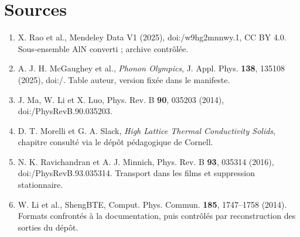 \documentclass[11pt,a4paper]{article}
\begin{document}
\section{Sources}
\begin{enumerate}
\item X. Rao et al., Mendeley Data V1 (2025), doi:/\allowbreak w9hg2mnnwy.1, CC BY 4.0. Sous-ensemble AlN converti ; archive contrôlée.
\item A. J. H. McGaughey et al., \emph{Phonon Olympics}, J. Appl. Phys. \textbf{138}, 135108 (2025), doi:/. Table auteur, version fixée dans le manifeste.
\item J. Ma, W. Li et X. Luo, Phys. Rev. B \textbf{90}, 035203 (2014), doi:/\allowbreak PhysRevB.90.035203.
\item D. T. Morelli et G. A. Slack, \emph{High Lattice Thermal Conductivity Solids}, chapitre consulté via le dépôt pédagogique de Cornell.
\item N. K. Ravichandran et A. J. Minnich, Phys. Rev. B \textbf{93}, 035314 (2016), doi:/\allowbreak PhysRevB.93.035314. Transport dans les films et suppression stationnaire.
\item W. Li et al., ShengBTE, Comput. Phys. Commun. \textbf{185}, 1747--1758 (2014). Formats confrontés à la documentation, puis contrôlés par reconstruction des sorties du dépôt.
\end{enumerate}
\end{document}
